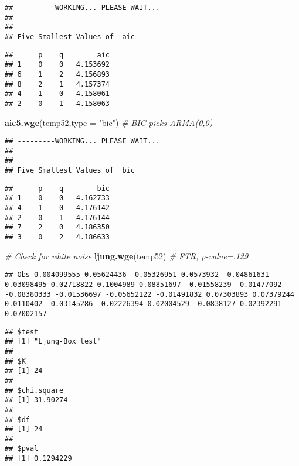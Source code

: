 \documentclass[]{article}
\newenvironment{Shaded}{\begin{snugshade}}{\end{snugshade}}
\newcommand{\KeywordTok}[1]{\textcolor[rgb]{0.13,0.29,0.53}{\textbf{#1}}}
\newcommand{\DataTypeTok}[1]{\textcolor[rgb]{0.13,0.29,0.53}{#1}}
\newcommand{\StringTok}[1]{\textcolor[rgb]{0.31,0.60,0.02}{#1}}
\newcommand{\CommentTok}[1]{\textcolor[rgb]{0.56,0.35,0.01}{\textit{#1}}}
\newcommand{\NormalTok}[1]{#1}
\begin{document}
\begin{verbatim}
## ---------WORKING... PLEASE WAIT... 
## 
## 
## Five Smallest Values of  aic
\end{verbatim}

\begin{verbatim}
##      p    q        aic
## 1    0    0   4.153692
## 6    1    2   4.156893
## 8    2    1   4.157374
## 4    1    0   4.158061
## 2    0    1   4.158063
\end{verbatim}

\begin{Shaded}
\begin{Highlighting}[]
\KeywordTok{aic5.wge}\NormalTok{(temp52,}\DataTypeTok{type =} \StringTok{"bic"}\NormalTok{)                       }\CommentTok{# BIC picks ARMA(0,0)}
\end{Highlighting}
\end{Shaded}

\begin{verbatim}
## ---------WORKING... PLEASE WAIT... 
## 
## 
## Five Smallest Values of  bic
\end{verbatim}

\begin{verbatim}
##      p    q        bic
## 1    0    0   4.162733
## 4    1    0   4.176142
## 2    0    1   4.176144
## 7    2    0   4.186350
## 3    0    2   4.186633
\end{verbatim}

\begin{Shaded}
\begin{Highlighting}[]
\CommentTok{# Check for white noise}
\KeywordTok{ljung.wge}\NormalTok{(temp52)                                   }\CommentTok{# FTR, p-value=.129}
\end{Highlighting}
\end{Shaded}

\begin{verbatim}
## Obs 0.004099555 0.05624436 -0.05326951 0.0573932 -0.04861631 0.03098495 0.02718822 0.1004989 0.08851697 -0.01558239 -0.01477092 -0.08380333 -0.01536697 -0.05652122 -0.01491832 0.07303893 0.07379244 0.0110402 -0.03145286 -0.02226394 0.02004529 -0.0838127 0.02392291 0.07002157
\end{verbatim}

\begin{verbatim}
## $test
## [1] "Ljung-Box test"
## 
## $K
## [1] 24
## 
## $chi.square
## [1] 31.90274
## 
## $df
## [1] 24
## 
## $pval
## [1] 0.1294229
\end{verbatim}
\end{document}
